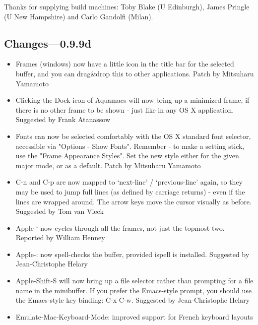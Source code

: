 	
	Thanks for supplying build machines: Toby Blake (U Edinburgh),
	James Pringle (U New Hampshire) and Carlo Gandolfi (Milan).


\subsection{Changes---0.9.9d}


\begin{itemize}


\item  Frames (windows) now have a little icon in the title bar for the
	selected buffer, and you can drag\&drop this to other applications.
	Patch by  Mitsuharu Yamamoto

\item  Clicking the Dock icon of Aquamacs will now bring up a minimized
	frame, if there is no other frame to be shown - just like in any
	OS X application.
	Suggested by Frank Atanassow

\item  Fonts can now be selected comfortably with the OS X standard
	font selector, accessible via "Options - Show Fonts".
	Remember  - to make a setting stick, use the "Frame Appearance
	Styles". Set the new style either for the given major mode, or as
	a default.
	Patch by  Mitsuharu Yamamoto
	
\item  C-n and C-p are now mapped to `next-line' / `previous-line'
	again, so they may be used to jump full lines (as defined by
	carriage returns) - even if the lines are wrapped around. The
	arrow keys move the cursor visually as before. 
	Suggested by Tom van Vleck

\item  Apple-` now cycles through all the frames, not just the topmost two.
	Reported by William Henney

\item  Apple-: now spell-checks the buffer, provided ispell is installed.
	Suggested by Jean-Christophe Helary
	
\item  Apple-Shift-S will now bring up a file selector rather than
	prompting for a file name in the minibuffer. If you prefer the
	Emacs-style prompt, you should use the Emacs-style key binding:
	C-x C-w.
	Suggested by Jean-Christophe Helary

\item  Emulate-Mac-Keyboard-Mode: improved support for French keyboard
	layouts
	

\end{itemize}
